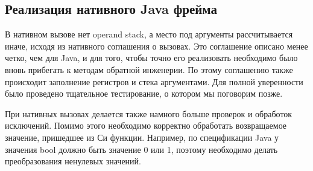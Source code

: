 \subsection{Реализация нативного Java фрейма}
В нативном вызове нет operand stack, а место под аргументы рассчитывается иначе, исходя из нативного соглашения о вызовах. Это соглашение описано менее четко, чем для Java, и для того, чтобы точно его реализовать необходимо было вновь прибегать к методам обратной инженерии. По этому соглашению также происходит заполнение регистров и стека аргументами. Для полной уверенности было проведено тщательное тестирование, о котором мы поговорим позже.


При нативных вызовах делается также намного больше проверок и обработок исключений. Помимо этого необходимо корректно обработать возвращаемое значение, пришедшее из Си функции. Например, по спецификации Java у значения bool должно быть значение 0 или 1, поэтому необходимо делать преобразования ненулевых значений.


